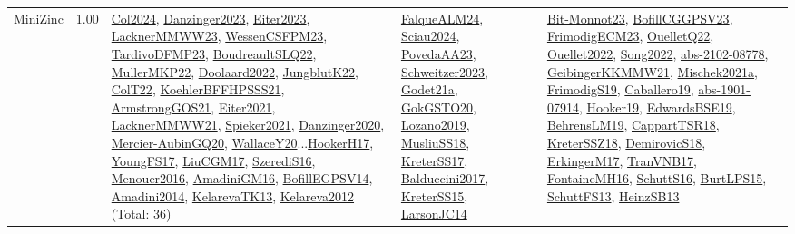 {\begin{longtable}{p{3cm}r>{\raggedright\arraybackslash}p{6cm}>{\raggedright\arraybackslash}p{6cm}>{\raggedright\arraybackslash}p{8cm}}
\index{MiniZinc}\index{CPSystems!MiniZinc}MiniZinc &  1.00 & \hyperref[detail:Col2024]{Col2024}, \hyperref[detail:Danzinger2023]{Danzinger2023}, \hyperref[detail:Eiter2023]{Eiter2023}, \hyperref[detail:LacknerMMWW23]{LacknerMMWW23}, \hyperref[detail:WessenCSFPM23]{WessenCSFPM23}, \hyperref[detail:TardivoDFMP23]{TardivoDFMP23}, \hyperref[detail:BoudreaultSLQ22]{BoudreaultSLQ22}, \hyperref[detail:MullerMKP22]{MullerMKP22}, \hyperref[detail:Doolaard2022]{Doolaard2022}, \hyperref[detail:JungblutK22]{JungblutK22}, \hyperref[detail:ColT22]{ColT22}, \hyperref[detail:KoehlerBFFHPSSS21]{KoehlerBFFHPSSS21}, \hyperref[detail:ArmstrongGOS21]{ArmstrongGOS21}, \hyperref[detail:Eiter2021]{Eiter2021}, \hyperref[detail:LacknerMMWW21]{LacknerMMWW21}, \hyperref[detail:Spieker2021]{Spieker2021}, \hyperref[detail:Danzinger2020]{Danzinger2020}, \hyperref[detail:Mercier-AubinGQ20]{Mercier-AubinGQ20}, \hyperref[detail:WallaceY20]{WallaceY20}...\hyperref[detail:HookerH17]{HookerH17}, \hyperref[detail:YoungFS17]{YoungFS17}, \hyperref[detail:LiuCGM17]{LiuCGM17}, \hyperref[detail:SzerediS16]{SzerediS16}, \hyperref[detail:Menouer2016]{Menouer2016}, \hyperref[detail:AmadiniGM16]{AmadiniGM16}, \hyperref[detail:BofillEGPSV14]{BofillEGPSV14}, \hyperref[detail:Amadini2014]{Amadini2014}, \hyperref[detail:KelarevaTK13]{KelarevaTK13}, \hyperref[detail:Kelareva2012]{Kelareva2012} (Total: 36) & \hyperref[detail:FalqueALM24]{FalqueALM24}, \hyperref[detail:Sciau2024]{Sciau2024}, \hyperref[detail:PovedaAA23]{PovedaAA23}, \hyperref[detail:Schweitzer2023]{Schweitzer2023}, \hyperref[detail:Godet21a]{Godet21a}, \hyperref[detail:GokGSTO20]{GokGSTO20}, \hyperref[detail:Lozano2019]{Lozano2019}, \hyperref[detail:MusliuSS18]{MusliuSS18}, \hyperref[detail:KreterSS17]{KreterSS17}, \hyperref[detail:Balduccini2017]{Balduccini2017}, \hyperref[detail:KreterSS15]{KreterSS15}, \hyperref[detail:LarsonJC14]{LarsonJC14} & \hyperref[detail:Bit-Monnot23]{Bit-Monnot23}, \hyperref[detail:BofillCGGPSV23]{BofillCGGPSV23}, \hyperref[detail:FrimodigECM23]{FrimodigECM23}, \hyperref[detail:OuelletQ22]{OuelletQ22}, \hyperref[detail:Ouellet2022]{Ouellet2022}, \hyperref[detail:Song2022]{Song2022}, \hyperref[detail:abs-2102-08778]{abs-2102-08778}, \hyperref[detail:GeibingerKKMMW21]{GeibingerKKMMW21}, \hyperref[detail:Mischek2021a]{Mischek2021a}, \hyperref[detail:FrimodigS19]{FrimodigS19}, \hyperref[detail:Caballero19]{Caballero19}, \hyperref[detail:abs-1901-07914]{abs-1901-07914}, \hyperref[detail:Hooker19]{Hooker19}, \hyperref[detail:EdwardsBSE19]{EdwardsBSE19}, \hyperref[detail:BehrensLM19]{BehrensLM19}, \hyperref[detail:CappartTSR18]{CappartTSR18}, \hyperref[detail:KreterSSZ18]{KreterSSZ18}, \hyperref[detail:DemirovicS18]{DemirovicS18}, \hyperref[detail:ErkingerM17]{ErkingerM17}, \hyperref[detail:TranVNB17]{TranVNB17}, \hyperref[detail:FontaineMH16]{FontaineMH16}, \hyperref[detail:SchuttS16]{SchuttS16}, \hyperref[detail:BurtLPS15]{BurtLPS15}, \hyperref[detail:SchuttFS13]{SchuttFS13}, \hyperref[detail:HeinzSB13]{HeinzSB13}\\

\end{longtable}}
